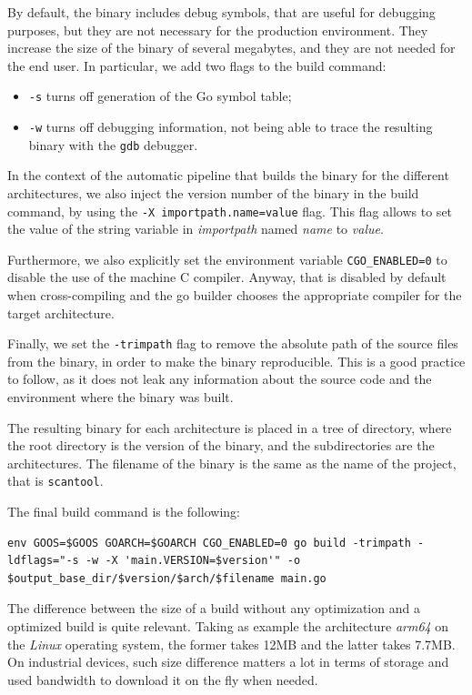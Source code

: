 By default, the binary includes debug symbols, that are useful for debugging purposes, but they are not necessary for the production environment. They increase the size of the binary of several megabytes, and they are not needed for the end user. In particular, we add two flags to the build command:~\cite{go-ldflags-all,go-ldflags-s-w}
\begin{itemize}
  \item \texttt{-s} turns off generation of the Go symbol table;
  \item \texttt{-w} turns off debugging information, not being able to trace the resulting binary with the \texttt{gdb} debugger.
\end{itemize}

In the context of the automatic pipeline that builds the binary for the different architectures, we also inject the version number of the binary in the build command, by using the \texttt{-X importpath.name=value} flag. This flag allows to set the value of the string variable in \textit{importpath} named \textit{name} to \textit{value}.~\cite{go-ldflags-all}

Furthermore, we also explicitly set the environment variable \texttt{CGO\_ENABLED=0} to disable the use of the machine C compiler. Anyway, that is disabled by default when cross-compiling and the go builder chooses the appropriate compiler for the target architecture.~\cite{go-cgo-compiler}

Finally, we set the \texttt{-trimpath} flag to remove the absolute path of the source files from the binary, in order to make the binary reproducible. This is a good practice to follow, as it does not leak any information about the source code and the environment where the binary was built.~\cite{go-trimpath-arg}

The resulting binary for each architecture is placed in a tree of directory, where the root directory is the version of the binary, and the subdirectories are the architectures. The filename of the binary is the same as the name of the project, that is \texttt{scantool}.

The final build command is the following:
\begin{lstlisting}[caption={Go tool cross-build command}]
  env GOOS=$GOOS GOARCH=$GOARCH CGO_ENABLED=0 go build -trimpath -ldflags="-s -w -X 'main.VERSION=$version'" -o $output_base_dir/$version/$arch/$filename main.go
\end{lstlisting}

The difference between the size of a build without any optimization and a optimized build is quite relevant. Taking as example the architecture \textit{arm64} on the \textit{Linux} operating system, the former takes 12MB and the latter takes 7.7MB. On industrial devices, such size difference matters a lot in terms of storage and used bandwidth to download it on the fly when needed.

